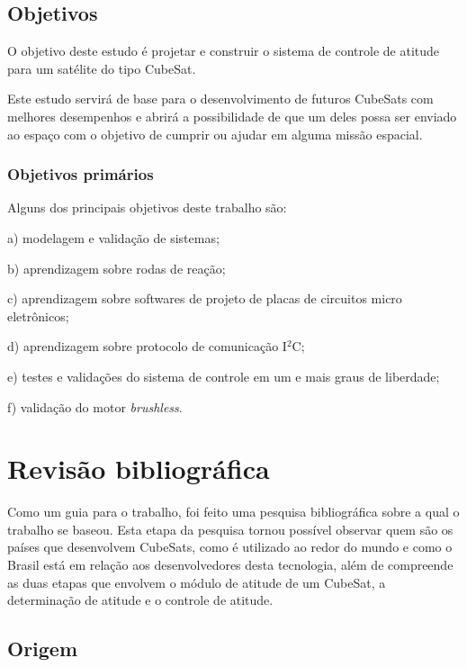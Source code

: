 \documentclass[
	12pt,				%
	openany,			%
	twoside,			%
	a4paper,			%
	english,			%
	french,				%
	spanish,			%
	brazil,				%
	oldfontcommands
	]{abntex2}
\begin{document}
\section{Objetivos}

O objetivo deste estudo é projetar e construir o sistema de controle de atitude para um satélite do tipo CubeSat.

Este estudo servirá de base para o desenvolvimento de futuros CubeSats com melhores desempenhos e abrirá a possibilidade de que um deles possa ser enviado ao espaço com o objetivo de cumprir ou ajudar em alguma missão espacial.

\subsection{Objetivos primários}

Alguns dos principais objetivos deste trabalho são:

a)	modelagem e validação de sistemas;

b)	aprendizagem sobre rodas de reação;

c)	aprendizagem sobre softwares de projeto de placas de circuitos micro eletrônicos;

d)	aprendizagem sobre protocolo de comunicação I$^{2}$C;

e)	testes e validações do sistema de controle em um e mais graus de liberdade;

f) validação do motor \textit{brushless}.


\chapter{Revisão bibliográfica}

Como um guia para o trabalho, foi feito uma pesquisa bibliográfica sobre a qual o trabalho se baseou. Esta etapa da pesquisa tornou possível observar quem são os países que desenvolvem CubeSats, como é utilizado ao redor do mundo e como o Brasil está em relação aos desenvolvedores desta tecnologia, além de compreende as duas etapas que envolvem o módulo de atitude de um CubeSat, a determinação de atitude e o controle de atitude.

\section{Origem}
\end{document}
